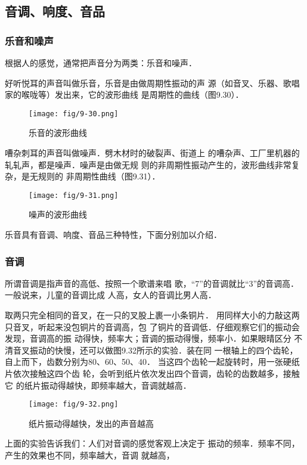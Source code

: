 \subsection{音调、响度、音品}
\subsubsection{乐音和噪声}

根据人的感觉，通常把声音分为两类：乐音和噪声．

好听悦耳的声音叫做乐音，乐音是由做周期性振动的声
源（如音叉、乐器、歌唱家的喉咙等）发出来，它的波形曲线
是周期性的曲线（图9.30）．
\begin{figure}[htp]\centering
    \texttt{[image: fig/9-30.png]}
    \caption{乐音的波形曲线}
    \end{figure}

嘈杂刺耳的声音叫做噪声．劈木材时的破裂声、街道上
的嘈杂声、工厂里机器的轧轧声，都是噪声．噪声是由做无规
则的非周期性振动产生的，波形曲线非常复杂，是无规则的
非周期性曲线（图9.31）．
\begin{figure}[htp]\centering
    \texttt{[image: fig/9-31.png]}
    \caption{噪声的波形曲线}
    \end{figure}


乐音具有音调、响度、音品三种特性，下面分别加以介绍．

\subsubsection{音调}


所谓音调是指声音的高低、按照一个歌谱来唱
歌，“7”的音调就比“3”的音调高．一般说来，儿童的音调比成
人高，女人的音调比男人高．

取两只完全相同的音叉，在一只的叉股上裹一小条铜片．
用同样大小的力敲这两只音叉，听起来没包铜片的音调高，包
了铜片的音调低．仔细观察它们的振动会发现，音调高的振
动得快，频率大；音调的振动得慢，频率小．如果眼晴区分
不清音叉振动的快慢，还可以做图9.32所示的实验．装在同
一根轴上的四个齿轮，自上而下，齿数分别为80、60、50、40．
当这四个齿轮一起旋转时，用一张硬纸片依次接触这四个齿
轮，会听到纸片依次发出四个音调，齿轮的齿数越多，接触它
的纸片振动得越快，即频率越大，音调就越高．
\begin{figure}[htp]
    \centering
    \texttt{[image: fig/9-32.png]}
    \caption{纸片振动得越快，发出的声音越高}
\end{figure}

上面的实验告诉我们：人们对音调的感觉客观上决定于
振动的频率．频率不同，产生的效果也不同，频率越大，音调
就越高，

